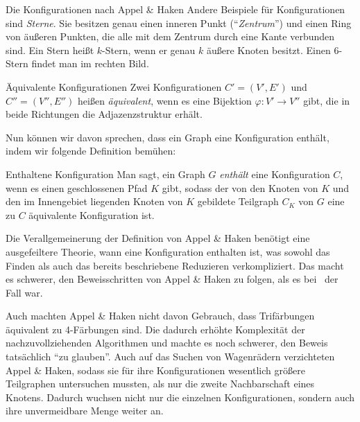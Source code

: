 \begin{section}{Die Konfigurationen nach Appel \& Haken}
  Andere Beispiele für Konfigurationen sind \textit{Sterne}. Sie besitzen genau einen inneren Punkt (``\textit{Zentrum}'') und einen Ring von äußeren Punkten, die alle mit dem Zentrum durch eine Kante verbunden sind. Ein Stern heißt $k$-Stern, wenn er genau $k$ äußere Knoten besitzt. Einen $6$-Stern findet man im rechten Bild.
  
  \begin{definition}{Äquivalente Konfigurationen}
   Zwei Konfigurationen $C'=(V',E')$ und $C''=(V'',E'')$ heißen \textit{äquivalent}, wenn es eine Bijektion $\varphi : V' \rightarrow V''$ gibt, die in beide Richtungen die Adjazenzstruktur erhält.
  \end{definition}
  
  Nun können wir davon sprechen, dass ein Graph eine Konfiguration enthält, indem wir folgende Definition bemühen:
  
  \begin{definition}{Enthaltene Konfiguration}
   Man sagt, ein Graph $G$ \textit{enthält} eine Konfiguration $C$, wenn es einen geschlossenen Pfad $K$ gibt, sodass der von den Knoten von $K$ und den im Innengebiet liegenden Knoten von $K$ gebildete Teilgraph $C_K$ von $G$ eine zu $C$ äquivalente Konfiguration ist.
  \end{definition}

  Die Verallgemeinerung der Definition von Appel \& Haken benötigt eine ausgefeiltere Theorie, wann eine Konfiguration enthalten ist, was sowohl das Finden als auch das bereits beschriebene Reduzieren verkompliziert. Das macht es schwerer, den Beweisschritten von Appel \& Haken zu folgen, als es bei \rsst\-\ der Fall war.
  
  Auch machten Appel \& Haken nicht davon Gebrauch, dass Trifärbungen äquivalent zu 4-Färbungen sind. Die dadurch erhöhte Komplexität der nachzuvollziehenden Algorithmen und machte es noch schwerer, den Beweis tatsächlich ``zu glauben''. Auch auf das Suchen von Wagenrädern verzichteten Appel \& Haken, sodass sie für ihre Konfigurationen wesentlich größere Teilgraphen untersuchen mussten, als nur die zweite Nachbarschaft eines Knotens. Dadurch wuchsen nicht nur die einzelnen Konfigurationen, sondern auch ihre unvermeidbare Menge weiter an.
\end{section}
